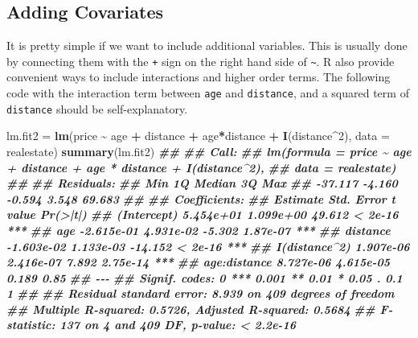 \documentclass[
]{book}
\newenvironment{Shaded}{\begin{snugshade}}{\end{snugshade}}
\newcommand{\AttributeTok}[1]{\textcolor[rgb]{0.13,0.29,0.53}{#1}}
\newcommand{\DecValTok}[1]{\textcolor[rgb]{0.00,0.00,0.81}{#1}}
\newcommand{\DocumentationTok}[1]{\textcolor[rgb]{0.56,0.35,0.01}{\textbf{\textit{#1}}}}
\newcommand{\FunctionTok}[1]{\textcolor[rgb]{0.13,0.29,0.53}{\textbf{#1}}}
\newcommand{\NormalTok}[1]{#1}
\newcommand{\OtherTok}[1]{\textcolor[rgb]{0.56,0.35,0.01}{#1}}
\newcommand{\SpecialCharTok}[1]{\textcolor[rgb]{0.81,0.36,0.00}{\textbf{#1}}}
\theoremstyle{definition}
\theoremstyle{definition}
\theoremstyle{definition}
\theoremstyle{definition}
\theoremstyle{remark}
\begin{document}
\hypertarget{adding-covariates}{%
\subsection{Adding Covariates}\label{adding-covariates}}

It is pretty simple if we want to include additional variables. This is usually done by connecting them with the \texttt{+} sign on the right hand side of \texttt{\textasciitilde{}}. R also provide convenient ways to include interactions and higher order terms. The following code with the interaction term between \texttt{age} and \texttt{distance}, and a squared term of \texttt{distance} should be self-explanatory.

\begin{Shaded}
\begin{Highlighting}[]
\NormalTok{    lm.fit2 }\OtherTok{=} \FunctionTok{lm}\NormalTok{(price }\SpecialCharTok{\textasciitilde{}}\NormalTok{ age }\SpecialCharTok{+}\NormalTok{ distance }\SpecialCharTok{+}\NormalTok{ age}\SpecialCharTok{*}\NormalTok{distance }\SpecialCharTok{+} \FunctionTok{I}\NormalTok{(distance}\SpecialCharTok{\^{}}\DecValTok{2}\NormalTok{), }\AttributeTok{data =}\NormalTok{ realestate)}
    \FunctionTok{summary}\NormalTok{(lm.fit2)}
\DocumentationTok{\#\# }
\DocumentationTok{\#\# Call:}
\DocumentationTok{\#\# lm(formula = price \textasciitilde{} age + distance + age * distance + I(distance\^{}2), }
\DocumentationTok{\#\#     data = realestate)}
\DocumentationTok{\#\# }
\DocumentationTok{\#\# Residuals:}
\DocumentationTok{\#\#     Min      1Q  Median      3Q     Max }
\DocumentationTok{\#\# {-}37.117  {-}4.160  {-}0.594   3.548  69.683 }
\DocumentationTok{\#\# }
\DocumentationTok{\#\# Coefficients:}
\DocumentationTok{\#\#                 Estimate Std. Error t value Pr(\textgreater{}|t|)    }
\DocumentationTok{\#\# (Intercept)    5.454e+01  1.099e+00  49.612  \textless{} 2e{-}16 ***}
\DocumentationTok{\#\# age           {-}2.615e{-}01  4.931e{-}02  {-}5.302 1.87e{-}07 ***}
\DocumentationTok{\#\# distance      {-}1.603e{-}02  1.133e{-}03 {-}14.152  \textless{} 2e{-}16 ***}
\DocumentationTok{\#\# I(distance\^{}2)  1.907e{-}06  2.416e{-}07   7.892 2.75e{-}14 ***}
\DocumentationTok{\#\# age:distance   8.727e{-}06  4.615e{-}05   0.189     0.85    }
\DocumentationTok{\#\# {-}{-}{-}}
\DocumentationTok{\#\# Signif. codes:  0 \textquotesingle{}***\textquotesingle{} 0.001 \textquotesingle{}**\textquotesingle{} 0.01 \textquotesingle{}*\textquotesingle{} 0.05 \textquotesingle{}.\textquotesingle{} 0.1 \textquotesingle{} \textquotesingle{} 1}
\DocumentationTok{\#\# }
\DocumentationTok{\#\# Residual standard error: 8.939 on 409 degrees of freedom}
\DocumentationTok{\#\# Multiple R{-}squared:  0.5726, Adjusted R{-}squared:  0.5684 }
\DocumentationTok{\#\# F{-}statistic:   137 on 4 and 409 DF,  p{-}value: \textless{} 2.2e{-}16}
\end{Highlighting}
\end{Shaded}
\end{document}
